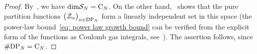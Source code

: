 \documentclass[oneside,english]{amsart}
\numberwithin{equation}{section}
\numberwithin{figure}{section}
\theoremstyle{plain}
\theoremstyle{plain}
\theoremstyle{plain}
\theoremstyle{remark}
\theoremstyle{plain}
\theoremstyle{plain}
\theoremstyle{plain}
\theoremstyle{plain}
\theoremstyle{plain}
\theoremstyle{plain}
\theoremstyle{plain}
\theoremstyle{plain}
\begin{document}
\begin{proof}
By~\cite[Theorem~8]{FK-solution_space_for_a_system_of_null_state_PDEs_3}, 
we have
$\mathrm{dim} \mathcal{S}_N = \mathrm{C}_N$. 
On the other hand,~\cite[Theorem~4.1]{KP-pure_partition_functions_of_multiple_SLEs}
shows that the pure partition functions $\big( \mathcal{Z}_\alpha \big)_{\alpha \in \mathrm{DP}_N}$
form a linearly independent set in this space
(the power-law bound~\eqref{eq: power law growth bound} can be verified from the explicit form of 
the functions as Coulomb gas integrals, 
see~\cite{KP-pure_partition_functions_of_multiple_SLEs, KP-conformally_covariant_boundary_correlation_functions_with_a_quantum_group}). 
The assertion follows, since $\# \mathrm{DP}_N = \mathrm{C}_N$.
\end{proof}
\end{document}
